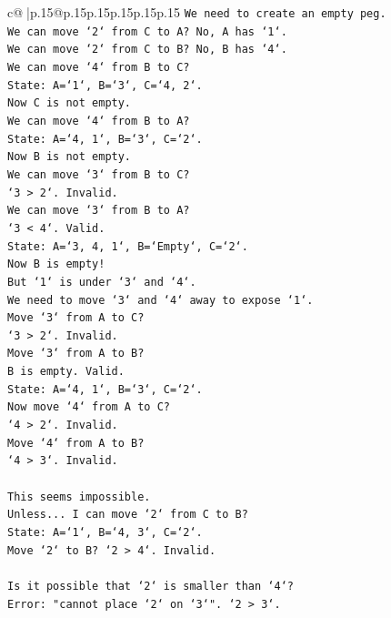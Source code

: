 \documentclass{article}
\begin{document}
{\begin{supertabular}{c@{$\;$}|p{.15\linewidth}@{}p{.15\linewidth}p{.15\linewidth}p{.15\linewidth}p{.15\linewidth}p{.15\linewidth}}
{{{\texttt{We need to create an empty peg.} \\
\texttt{We can move `2` from C to A? No, A has `1`.} \\
\texttt{We can move `2` from C to B? No, B has `4`.} \\
\texttt{We can move `4` from B to C?} \\
\texttt{State: A=`1`, B=`3`, C=`4, 2`.} \\
\texttt{Now C is not empty.} \\
\texttt{We can move `4` from B to A?} \\
\texttt{State: A=`4, 1`, B=`3`, C=`2`.} \\
\texttt{Now B is not empty.} \\
\texttt{We can move `3` from B to C?} \\
\texttt{`3 > 2`. Invalid.} \\
\texttt{We can move `3` from B to A?} \\
\texttt{`3 < 4`. Valid.} \\
\texttt{State: A=`3, 4, 1`, B=`Empty`, C=`2`.} \\
\texttt{Now B is empty!} \\
\texttt{But `1` is under `3` and `4`.} \\
\texttt{We need to move `3` and `4` away to expose `1`.} \\
\texttt{Move `3` from A to C?} \\
\texttt{`3 > 2`. Invalid.} \\
\texttt{Move `3` from A to B?} \\
\texttt{B is empty. Valid.} \\
\texttt{State: A=`4, 1`, B=`3`, C=`2`.} \\
\texttt{Now move `4` from A to C?} \\
\texttt{`4 > 2`. Invalid.} \\
\texttt{Move `4` from A to B?} \\
\texttt{`4 > 3`. Invalid.} \\
\\ 
\texttt{This seems impossible.} \\
\texttt{Unless... I can move `2` from C to B?} \\
\texttt{State: A=`1`, B=`4, 3`, C=`2`.} \\
\texttt{Move `2` to B? `2 > 4`. Invalid.} \\
\\ 
\texttt{Is it possible that `2` is smaller than `4`?} \\
\texttt{Error: "cannot place `2` on `3`". `2 > 3`.} \\
}}}
\end{supertabular}}
\end{document}
